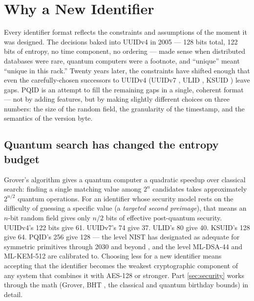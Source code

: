 \section{Why a New Identifier}
\label{sec:why}

Every identifier format reflects the constraints and assumptions of the moment it was designed. The decisions baked into UUIDv4 \citep{rfc4122} in 2005 --- 128 bits total, 122 bits of entropy, no time component, no ordering --- made sense when distributed databases were rare, quantum computers were a footnote, and ``unique'' meant ``unique in this rack.'' Twenty years later, the constraints have shifted enough that even the carefully-chosen successors to UUIDv4 (UUIDv7 \citep{rfc9562}, ULID \citep{ulid}, KSUID \citep{ksuid}) leave gaps. PQID is an attempt to fill the remaining gaps in a single, coherent format --- not by adding features, but by making slightly different choices on three numbers: the size of the random field, the granularity of the timestamp, and the semantics of the version byte.

\subsection{Quantum search has changed the entropy budget}

Grover's algorithm \citep{grover1996} gives a quantum computer a quadratic speedup over classical search: finding a single matching value among $2^n$ candidates takes approximately $2^{n/2}$ quantum operations. For an identifier whose security model rests on the difficulty of guessing a specific value (a \emph{targeted second preimage}), that means an $n$-bit random field gives only $n/2$ bits of effective post-quantum security. UUIDv4's 122 bits give 61. UUIDv7's 74 give 37. ULID's 80 give 40. KSUID's 128 give 64. PQID's 256 give 128 --- the level NIST has designated as adequate for symmetric primitives through 2030 and beyond \citep{nist80057}, and the level ML-DSA-44 \citep{fips204} and ML-KEM-512 \citep{fips203} are calibrated to. Choosing less for a new identifier means accepting that the identifier becomes the weakest cryptographic component of any system that combines it with AES-128 \citep{fips197} or stronger. Part \ref{sec:security} works through the math (Grover, BHT \citep{bht1998}, the classical and quantum birthday bounds) in detail.

